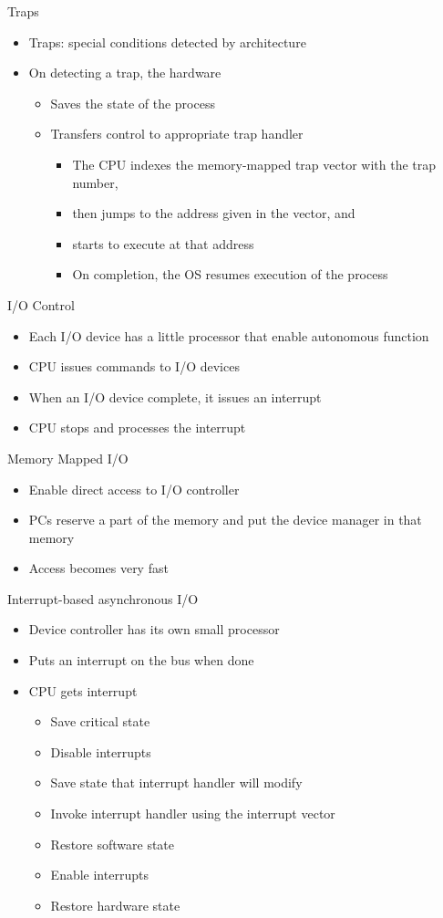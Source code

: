 \documentclass[12pt]{article}
\begin{document}
Traps
\begin{itemize}
    \item Traps: special conditions detected by architecture
    \item On detecting a trap, the hardware
    \begin{itemize}
        \item Saves the state of the process
        \item Transfers control to appropriate trap handler
        \begin{itemize}
            \item The CPU indexes the memory-mapped trap vector with the trap number,
            \item then jumps to the address given in the vector, and
            \item starts to execute at that address
            \item On completion, the OS resumes execution of the process
        \end{itemize}
    \end{itemize}
\end{itemize}

I/O Control
\begin{itemize}
    \item Each I/O device has a little processor that enable autonomous function
    \item CPU issues commands to I/O devices 
    \item When an I/O device complete, it issues an interrupt
    \item CPU stops and processes the interrupt
\end{itemize}

Memory Mapped I/O
\begin{itemize}
    \item Enable direct access to I/O controller
    \item PCs reserve a part of the memory and put the device manager in that memory
    \item Access becomes very fast
\end{itemize}

Interrupt-based asynchronous I/O
\begin{itemize}
    \item Device controller has its own small processor
    \item Puts an interrupt on the bus when done
    \item CPU gets interrupt
    \begin{itemize}
        \item Save critical state
        \item Disable interrupts
        \item Save state that interrupt handler will modify
        \item Invoke interrupt handler using the interrupt vector
        \item Restore software state
        \item Enable interrupts
        \item Restore hardware state
    \end{itemize}
\end{itemize}
\end{document}
